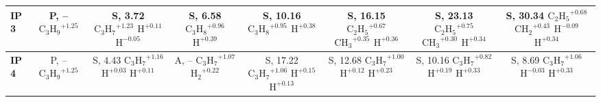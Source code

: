 \begin{table}[t]
\begin{tabular}{lccccccc}
\midrule
\textbf{IP 3} & \makecell{P, -- \\ $\mathrm{C_3H_9}^{+1.25}$} & \makecell{S, 3.72 \\ $\mathrm{C_3H_7}^{+1.23}$ \\ $\mathrm{H}^{+0.11}$ \\ $\mathrm{H}^{-0.05}$} & \makecell{S, 6.58 \\ $\mathrm{C_3H_8}^{+0.96}$ \\ $\mathrm{H}^{+0.39}$} & \makecell{S, 10.16 \\ $\mathrm{C_3H_8}^{+0.95}$ \\ $\mathrm{H}^{+0.38}$} & \makecell{S, 16.15 \\ $\mathrm{C_2H_5}^{+0.67}$ \\ $\mathrm{CH_3}^{+0.35}$ \\ $\mathrm{H}^{+0.36}$} & \makecell{S, 23.13 \\ $\mathrm{C_2H_5}^{+0.75}$ \\ $\mathrm{CH_3}^{+0.30}$ \\ $\mathrm{H}^{+0.34}$} & \makecell{S, 30.34 \\ $\mathrm{C_2H_5}^{+0.68}$ \\ $\mathrm{CH_2}^{+0.43}$ \\ $\mathrm{H}^{-0.09}$ \\ $\mathrm{H}^{+0.34}$} \\
\midrule
\textbf{IP 4} & \makecell{P, -- \\ $\mathrm{C_3H_9}^{+1.25}$} & \makecell{S, 4.43 \\ $\mathrm{C_3H_7}^{+1.16}$ \\ $\mathrm{H}^{+0.03}$ \\ $\mathrm{H}^{+0.11}$} & \makecell{A, -- \\ $\mathrm{C_3H_7}^{+1.07}$ \\ $\mathrm{H_2}^{+0.22}$} & \makecell{S, 17.22 \\ $\mathrm{C_3H_7}^{+1.06}$ \\ $\mathrm{H}^{+0.15}$ \\ $\mathrm{H}^{+0.13}$} & \makecell{S, 12.68 \\ $\mathrm{C_3H_7}^{+1.00}$ \\ $\mathrm{H}^{+0.12}$ \\ $\mathrm{H}^{+0.23}$} & \makecell{S, 10.16 \\ $\mathrm{C_3H_7}^{+0.82}$ \\ $\mathrm{H}^{+0.19}$ \\ $\mathrm{H}^{+0.33}$} & \makecell{S, 8.69 \\ $\mathrm{C_3H_7}^{+1.06}$ \\ $\mathrm{H}^{-0.03}$ \\ $\mathrm{H}^{+0.33}$} \\

\end{tabular}
\end{table}
